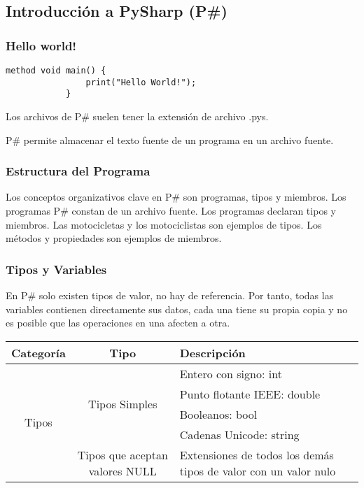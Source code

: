 \subsection{Introducción a PySharp (P\#)}
	\subsubsection{Hello world!}
	
		\begin{lstlisting}[language={PySharp}]
			method void main() {
				print("Hello World!");
			}
		\end{lstlisting}	
		Los archivos de P\# suelen tener la extensión de archivo .pys.\par
		
		P\# permite almacenar el texto fuente de un programa en un archivo fuente.	
		
	\subsubsection{Estructura del Programa}
		Los conceptos organizativos clave en P\# son programas, tipos y miembros. Los programas P\# constan de un archivo fuente. Los programas declaran tipos y miembros. Las motocicletas y los motociclistas son ejemplos de tipos. Los métodos y propiedades son ejemplos de miembros.
		
	\subsubsection{Tipos y Variables}
		En P\# solo existen tipos de valor, no hay de referencia. Por tanto, todas las variables contienen directamente sus datos, cada una tiene su propia copia y no es posible que las operaciones en una afecten a otra.\par
		\begin{center}
			\begin{tabular}{| c | c | m{5cm} | }
				\hline
				Categoría & Tipo & Descripción \\ \hline
				\multirow{5}{*}{Tipos} & \multirow{4}{*}{Tipos Simples} & Entero con signo: int \\ \cline{3-3}
				 &  & Punto flotante IEEE: double \\ \cline{3-3}
				 &  & Booleanos: bool \\ \cline{3-3}
				 &  & Cadenas Unicode: string \\ \cline{2-3}
				 & Tipos que aceptan valores NULL & Extensiones de todos los demás tipos de valor con un valor nulo \\ \hline
			\end{tabular}
		\end{center}
